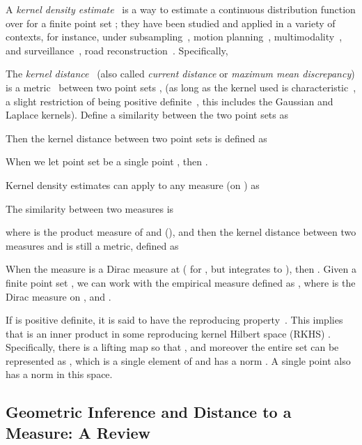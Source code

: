 \documentclass[11pt]{myclass}
\begin{document}
A \emph{kernel density estimate}~\cite{Sil86,Sco92,DG84,DL01} is a way to estimate a continuous distribution function over  for a finite point set ; they have been studied and applied in a variety of contexts, for instance, under subsampling~\cite{Phillips2013,big-kde,BFLRSW13}, motion planning~\cite{PEKK12}, multimodality~\cite{Sil81,EFR12}, and surveillance~\cite{EDHD02}, road reconstruction~\cite{BE12}.
Specifically, 


The \emph{kernel distance}~\cite{HB05,glaunesthesis,
JoshiKommarajuPhillips2011,PhillipsVenkatasubramanian2011} (also called \emph{current distance} or \emph{maximum mean discrepancy}) is a metric~\cite{Muller1997,SGFSL10} between two point sets ,  (as long as the kernel used is characteristic~\cite{SGFSL10}, a slight restriction of being positive definite~\cite{Aronszajn1950,Wah99}, this includes the Gaussian and Laplace kernels).
Define a similarity between the two point sets as 
 
Then the kernel distance between two point sets is defined as \vspace{-1mm}

When we let point set  be a single point , then .  

Kernel density estimates can apply to any measure  (on ) as 
 
The similarity between two measures is 
 
where  is the product measure of  and  (), and then the kernel distance between two measures  and  is still a metric, defined as  
 
When the measure  is a Dirac measure at  ( for , but integrates to ), then .  
Given a finite point set , we can work with the empirical measure  defined as , where  is the Dirac measure on , and .  


If  is positive definite, it is said to have the reproducing property~\cite{Aronszajn1950,Wah99}.
This implies that  is an inner product in some reproducing kernel Hilbert space (RKHS) .  Specifically, there is a lifting map  so that , and moreover the entire set  can be represented as , which is a single element of  and has a norm .  A single point  also has a norm  in this space.




\subsection{Geometric Inference and Distance to a Measure: A Review}
\label{sec:ball}
\end{document}
